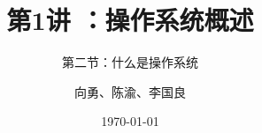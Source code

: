 


\title[第1讲]{第1讲 ：操作系统概述} %
\subtitle{第二节：什么是操作系统}
\author{向勇、陈渝、李国良} %
\date{\today} %



\begin{frame}
\titlepage %
\end{frame}

%
%


